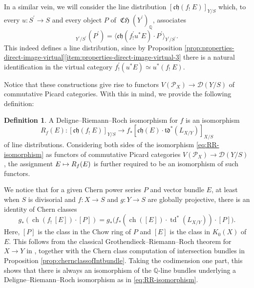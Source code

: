 \documentclass[JEP,XML,SOM,Unicode,published]{cedram}
\newcommand\mto{\mathchoice{\longmapsto}{\mapsto}{\mapsto}{\mapsto}}
\theoremstyle{plain}
\theoremstyle{definition}
\newtheorem{definition}[theorem]{Definition}
\newcommand{\QBbb}{\mathbb Q}
\newcommand{\Dcal}{\mathcal D}
\newcommand{\Pcal}{\mathcal P}
\newcommand{\chfrak}{\mathfrak {ch}}
\newcommand{\tdfrak}{\mathfrak {td}}
\DeclareMathOperator{\ch}{ch}
\DeclareMathOperator{\CHfrak}{\mathfrak{CH}}
\DeclareMathOperator{\td}{td}
\begin{document}
In a similar vein, we will consider the line distribution $[\chfrak(f_{!}\ E)]_{Y/S}$ which, to every $u\colon S^{\prime}\to S$ and every object $P$ of $\CHfrak(Y^{\prime})_{\QBbb}$, associates\vspace*{-3pt}\enlargethispage{.5\baselineskip}
\begin{displaymath}
[\chfrak(f_!\ E)]_{Y^{\prime}/S^{\prime}}(P^{\prime})=\langle\chfrak(f^{\prime}_{!} u^{\ast} E)\cdot P^{\prime}\rangle_{Y^{\prime}/S^{\prime}}.
\end{displaymath}
This indeed defines a line distribution, since by Proposition \ref{prop:properties-direct-image-virtual}\eqref{item:properties-direct-image-virtual-3} there is a natural identification in the virtual category $f^{\prime}_! (u^{\ast} E) \simeq u^{\ast} (f_!\ E)$.

Notice that these constructions give rise to functors $V(\Pcal_X)\to \Dcal(Y/S)$ of commutative Picard categories. With this in mind, we provide the following definition:
\begin{definition}
A Deligne--Riemann--Roch isomorphism for $f$ is an isomorphism\vspace*{-3pt}
\begin{equation}\label{eq:RR-isomorphism}
R_{f}(E)\colon [\chfrak(f_!\ E)]_{Y/S}\to f_\ast [\chfrak(E) \cdot \tdfrak^{\ast}(L_{X/Y})]_{X/S}
\end{equation}
of line distributions. Considering both sides of the isomorphism \eqref{eq:RR-isomorphism} as functors of commutative Picard categories $V(\Pcal_X)\to \Dcal(Y/S)$, the assignment $E\mto R_{f}(E)$ is further required to be an isomorphism of such functors.
\end{definition}

We notice that for a given Chern power series $P$ and vector bundle $E$, at least when $S$ is divisorial and $f: X \to S$ and $g: Y \to S$ are globally projective, there is an identity of Chern classes\vspace*{-3pt}
\begin{displaymath}
g_\ast \left(\ch(f_!\ [E]) \cdot [P] \right)= g_\ast \bigl(f_{\ast}(\ch([E]) \cdot \td^{\ast}(L_{X/Y})) \cdot [P]\bigr).
\end{displaymath}
Here, $[P]$ is the class in the Chow ring of $P $ and $[E]$ is the class in $K_0(X)$ of $E$. This follows from the classical Grothendieck--Riemann--Roch theorem for $X \to Y$ in \cite[Exp.\,VIII]{SGA6}, together with the Chern class computation of intersection bundles in Proposition \ref{prop:chernclassofIntbundle}. Taking the codimension one part, this shows that there is always an isomorphism of the $\QBbb$-line bundles underlying a Deligne--Riemann--Roch isomorphism as in \eqref{eq:RR-isomorphism}.
\end{document}
